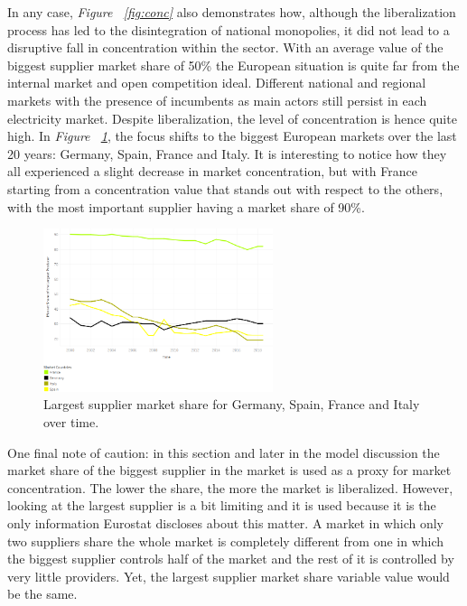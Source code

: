 \documentclass[a4paper,12pt]{book}
\begin{document}
In any case, \textit{Figure ~\ref{fig:conc}} also demonstrates how, although the liberalization process has led to the disintegration of national monopolies, it did not lead to a disruptive fall in concentration within the sector. With an average value of the biggest  supplier market share of 50\% the European situation is quite far from the internal market and open competition ideal. Different national and regional markets with the presence of incumbents as main actors still persist in each electricity market. Despite liberalization, the level of concentration is hence quite high.  In \textit{Figure ~\ref{fig:conc-mc}}, the focus shifts to the biggest European markets over the last 20 years: Germany, Spain, France and Italy. It is interesting to notice how they all experienced a slight decrease in market concentration, but with France starting from a concentration value that stands out with respect to the others, with the most important supplier having a market share of 90\%.

\begin{figure}[tb]
\begin{center}
\captionsetup{justification=centering}
\includegraphics[width=0.6\textwidth]{Images/conc-mc.png}
\caption{Largest supplier market share for Germany, Spain, France and Italy over time. }
\label{fig:conc-mc}
\end{center}
\end{figure}

One final note of caution: in this section and later in the model discussion the market share of the biggest supplier in the market is used as a proxy for market concentration. The lower the share, the more the market is liberalized. However, looking at the largest supplier is a bit limiting and it is used because it is the only information Eurostat discloses about this matter. A market in which only two suppliers share the whole market is completely different from one in which the biggest supplier controls half of the market and the rest of it is controlled by very little providers. Yet, the largest supplier market share variable value would be the same.
\end{document}
